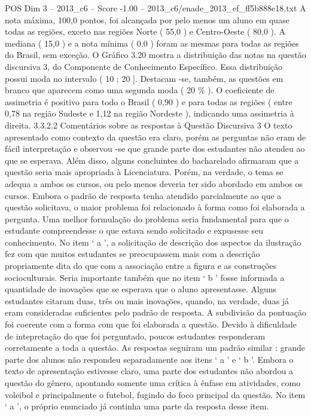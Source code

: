 \begin{textsample}{POS Dim 3 – 2013\_c6 – Score -1.00 – 2013\_c6/enade\_2013\_ef\_ff5b888e18.txt}
A nota máxima, 100,0 pontos, foi alcançada por pelo menos um aluno em quase todas as regiões, exceto nas regiões Norte ( 55,0 ) e Centro-Oeste ( 80,0 ).
A mediana ( 15,0 ) e a nota mínima ( 0,0 ) foram as mesmas para todas as regiões do Brasil, sem exceção.
O Gráfico 3.20 mostra a distribuição das notas na questão discursiva 3, do Componente de Conhecimento Específico.
Essa distribuição possui moda no intervalo ( 10 ; 20 ].
Destacam -se, também, as questões em branco que aparecem como uma segunda moda ( 20 \% ).
O coeficiente de assimetria é positivo para todo o Brasil ( 0,90 ) e para todas as regiões ( entre 0,78 na região Sudeste e 1,12 na região Nordeste ), indicando uma assimetria à direita. 3.3.2.2 Comentários sobre as respostas à Questão Discursiva 3 O texto apresentado como contexto da questão era claro, porém as perguntas não eram de fácil interpretação e observou -se que grande parte dos estudantes não atendeu ao que se esperava.
Além disso, alguns concluintes do bacharelado afirmaram que a questão seria mais apropriada à Licenciatura.
Porém, na verdade, o tema se adequa a ambos os cursos, ou pelo menos deveria ter sido abordado em ambos os cursos.
Embora o padrão de resposta tenha atendido parcialmente ao que a questão solicitava, o maior problema foi relacionado à forma como foi elaborada a pergunta.
Uma melhor formulação do problema seria fundamental para que o estudante compreendesse o que estava sendo solicitado e expusesse seu conhecimento.
No item ‘ a ’, a solicitação de descrição dos aspectos da ilustração fez com que muitos estudantes se preocupassem mais com a descrição propriamente dita do que com a associação entre a figura e as construções socioculturais.
Seria importante também que no item ‘ b ’ fosse informada a quantidade de inovações que se esperava que o aluno apresentasse.
Alguns estudantes citaram duas, três ou mais inovações, quando, na verdade, duas já eram consideradas suficientes pelo padrão de resposta.
A subdivisão da pontuação foi coerente com a forma com que foi elaborada a questão.
Devido à dificuldade de intepretação do que foi perguntado, poucos estudantes responderam corretamente a toda a questão.
As respostas seguiram um padrão similar : grande parte dos alunos não respondeu separadamente aos itens ‘ a ’ e ‘ b ’.
Embora o texto de apresentação estivesse claro, uma parte dos estudantes não abordou a questão do gênero, apontando somente uma crítica à ênfase em atividades, como voleibol e principalmente o futebol, fugindo do foco principal da questão.
No item ‘ a ’, o próprio enunciado já continha uma parte da resposta desse item.

\end{textsample}
